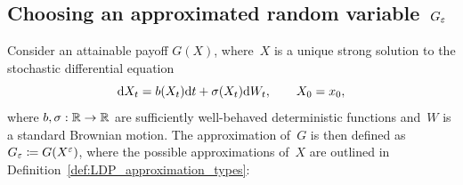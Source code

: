 \subsection{Choosing an approximated random variable~$G_{\varepsilon}$}\label{sec:Proxies}
Consider an attainable payoff $G(X)$, where~$X$ is
a unique strong solution to the stochastic differential equation
\begin{equation}\label{eq:SDE}
\mathrm{d} X_t = b(X_t) \mathrm{d} t + \sigma(X_t) \mathrm{d} W_t, \qquad X_0 = x_0,
\end{equation}
where $b,\sigma:\mathbb{R}\rightarrow \mathbb{R}$ are sufficiently well-behaved
deterministic functions and~$W$ is a standard Brownian motion. 
The approximation of~$G$ is then defined as  $G_{\varepsilon}\coloneqq G(X^{\varepsilon})$, 
where the possible approximations of~$X$ are outlined in Definition~\ref{def:LDP_approximation_types}:

